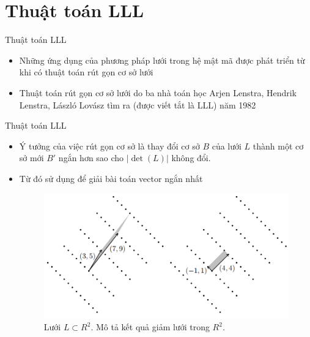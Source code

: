 \documentclass{beamer}
\numberwithin{equation}{section}
\begin{document}
\section{Thuật toán LLL}
\begin{frame}{Thuật toán LLL}
\begin{itemize}
\item Những ứng dụng của phương pháp lưới trong hệ mật mã được phát triển từ khi có thuật toán rút gọn cơ sở lưới
\item Thuật toán rút gọn cơ sở lưới do ba nhà toán học Arjen Lenstra, Hendrik Lenstra, László Lovász tìm ra (được viết tắt là LLL) năm 1982

\end{itemize}
\end{frame}
\begin{frame}{Thuật toán LLL}
\begin{itemize}
\item Ý tưởng của việc rút gọn cơ sở là thay đổi cơ sở $B$ của lưới $L$ thành một cơ sở mới $B'$ ngắn hơn sao cho $|\det(L)|$ không đổi.
\item Từ đó sử dụng để giải bài toán vector ngắn nhất

\begin{figure}[H]
\centering
\includegraphics[scale = 0.5]{pictures/mo_ta_ket_qua_giam_luoi_LLL.png}
\caption{Lưới $L \subset R^2$. Mô tả kết quả giảm lưới trong $R^2$.}
\end{figure}

\end{itemize}
\end{frame}
\end{document}
